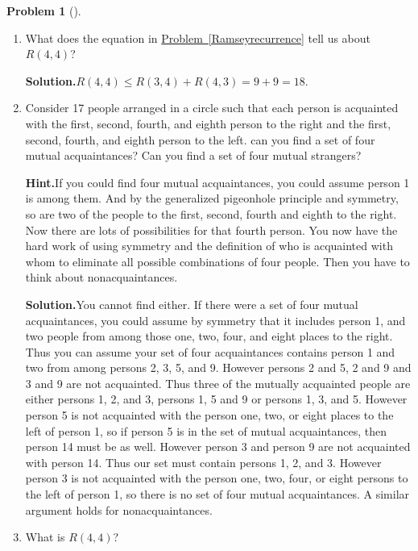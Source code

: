 \documentclass[10pt,]{book}
\theoremstyle{plain}
\theoremstyle{definition}
\newtheorem{activity}[project]{Problem}
\theoremstyle{definition}
\numberwithin{equation}{chapter}
\begin{document}
\begin{activity}[]\label{Ramseybound2}
\leavevmode%
\begin{enumerate}[font=\bfseries,label=(\alph*),ref=\alph*]
\item\label{task-73} What does the equation in \hyperref[Ramseyrecurrence]{Problem~\ref{Ramseyrecurrence}} tell us about \(R(4,4)\)?%
\par\medskip\noindent%
\textbf{Solution.}\quad \(R(4,4)\le R(3,4) + R(4,3) =9+9 = 18\).%
\item\label{task-74} Consider 17 people arranged in a circle such that each person is acquainted with the first, second, fourth, and eighth person to the right and the first, second, fourth, and eighth person to the left.  can you find a set of four mutual acquaintances?  Can you find a set of four mutual strangers?%
\par\medskip\noindent%
\textbf{Hint.}\quad If you could find four mutual acquaintances, you could assume person 1 is among them. And by the generalized pigeonhole principle and symmetry, so are two of the people to the first, second, fourth and eighth to the right. Now there are lots of possibilities for that fourth person. You now have the hard work of using symmetry and the definition of who is acquainted with whom to eliminate all possible combinations of four people. Then you have to think about nonacquaintances.%
\par\medskip\noindent%
\textbf{Solution.}\quad You cannot find either. If there were a set of four mutual acquaintances, you could assume by symmetry that it includes person 1, and two people from among those one, two, four, and eight places to the right. Thus you can assume your set of four acquaintances contains person 1 and two from among persons 2, 3, 5, and 9. However persons 2 and 5, 2 and 9 and 3 and 9 are not acquainted. Thus three of the mutually acquainted people are either persons 1, 2, and 3, persons 1, 5 and 9 or persons 1, 3, and 5. However person 5 is not acquainted with the person one, two, or eight places to the left of person 1, so if person 5 is in the set of mutual acquaintances, then person 14 must be as well. However person 3 and person 9 are not acquainted with person 14. Thus our set must contain persons 1, 2, and 3. However person 3 is not acquainted with the person one, two, four, or eight persons to the left of person 1, so there is no set of four mutual acquaintances. A similar argument holds for nonacquaintances.%
\item\label{task-75} What is \(R(4,4)\)?%
\end{enumerate}
\end{activity}
\end{document}
